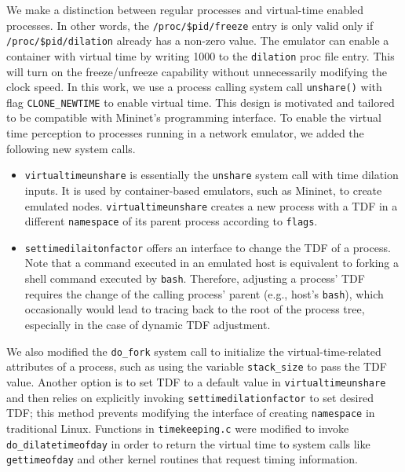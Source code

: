 We make a distinction between regular processes and virtual-time enabled processes. In other words, the \texttt{/proc/\$pid/freeze} entry is only valid only if \texttt{/proc/\$pid/dilation}  already has a non-zero value. The emulator can enable a container with virtual time by writing 1000 to the \texttt{dilation} proc file entry. This will turn on the freeze/unfreeze capability without unnecessarily modifying the clock speed. In this work, we use a process calling system call \texttt{unshare()} with flag \texttt{CLONE\_NEWTIME} to enable virtual time.
This design is motivated and tailored to be compatible with Mininet's programming interface.
To enable the virtual time perception to processes running in a network emulator, we added the following new system calls.
\begin{itemize}
    \item \texttt{virtualtimeunshare} is essentially the \texttt{unshare} system call with time dilation inputs.
        It is used by container-based emulators, such as Mininet, to create emulated nodes.
        \texttt{virtualtimeunshare} creates a new process with a TDF in a different \texttt{namespace} of its parent process according to \texttt{flags}.
    \item \texttt{settimedilaitonfactor} offers an interface to change the TDF of a process.
        Note that a command executed in an emulated host is equivalent to forking a shell command executed by \texttt{bash}. 
        Therefore, adjusting a process' TDF requires the change of the calling process' parent (e.g., host's \texttt{bash}),
        which occasionally would lead to tracing back to the root of the process tree, especially in the case of dynamic TDF adjustment. 
\end{itemize}

We also modified the \texttt{do\_fork} system call to initialize the virtual-time-related attributes of a process,
such as using the variable \texttt{stack\_size} to pass the TDF value. 
Another option is to set TDF to a default value in \texttt{virtualtimeunshare} and
then relies on explicitly invoking \texttt{settimedilationfactor} to set desired TDF;
this method prevents modifying the interface of creating \texttt{namespace} in traditional Linux. 
Functions in \texttt{timekeeping.c} were modified to invoke \texttt{do\_dilatetimeofday}
in order to return the virtual time to system calls like \texttt{gettimeofday} and other kernel routines that request timing information.


